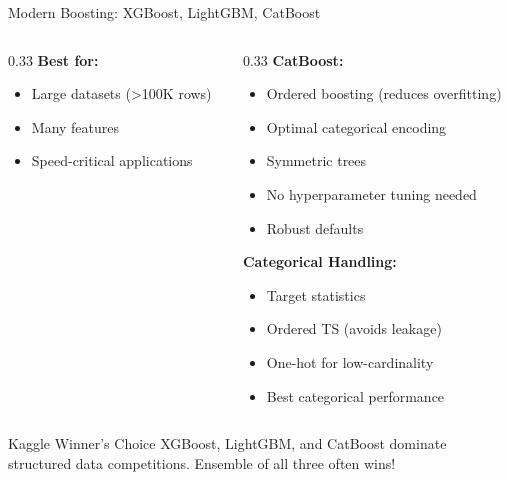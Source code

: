 \begin{frame}{Modern Boosting: XGBoost, LightGBM, CatBoost}
\begin{columns}
\begin{column}{0.33\textwidth}
\textbf{Best for:}
\begin{itemize}
\item Large datasets (>100K rows)
\item Many features
\item Speed-critical applications
\end{itemize}
\end{column}
\begin{column}{0.33\textwidth}
\textbf{CatBoost:}
\begin{itemize}
\item Ordered boosting (reduces overfitting)
\item Optimal categorical encoding
\item Symmetric trees
\item No hyperparameter tuning needed
\item Robust defaults
\end{itemize}

\textbf{Categorical Handling:}
\begin{itemize}
\item Target statistics
\item Ordered TS (avoids leakage)
\item One-hot for low-cardinality
\item Best categorical performance
\end{itemize}
\end{column}
\end{columns}

\vspace{0.3cm}
\begin{alertblock}{Kaggle Winner's Choice}
XGBoost, LightGBM, and CatBoost dominate structured data competitions. Ensemble of all three often wins!
\end{alertblock}
\end{frame}

